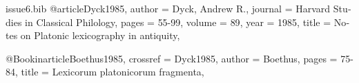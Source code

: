 

\begin{filecontents}{issue6.bib}
@article{Dyck1985,
  author = {Dyck, Andrew R.},
  journal =    {Harvard Studies in Classical Philology},
  pages =      {55-99},
  volume =     {89},
  year =       {1985},
  title =  {Notes on Platonic lexicography in antiquity},
}

@Bookinarticle{Boethus1985,
  crossref  = {Dyck1985},
  author =     {Boethus},
  pages =      {75-84},
  title =      {Lexicorum platonicorum fragmenta},
}
\end{filecontents}

\documentclass[11pt,a4paper]{book}
\usepackage{fontspec}
    \setmainfont{Linux Libertine O}

\usepackage{polyglossia}
    \setmainlanguage[babelshorthands=true]{italian}

\usepackage[%
    style=philosophy-classic,%
    backend=biber,%
    dashed=true,%
    url = false,%
    isbn = false,%
    firstinits=true,%
    uniquename=init,%
    ]{biblatex}
\usepackage{biblatex-bookinarticle}



\nocite{*}
\printbibliography

\newpage
\nocite{*}

